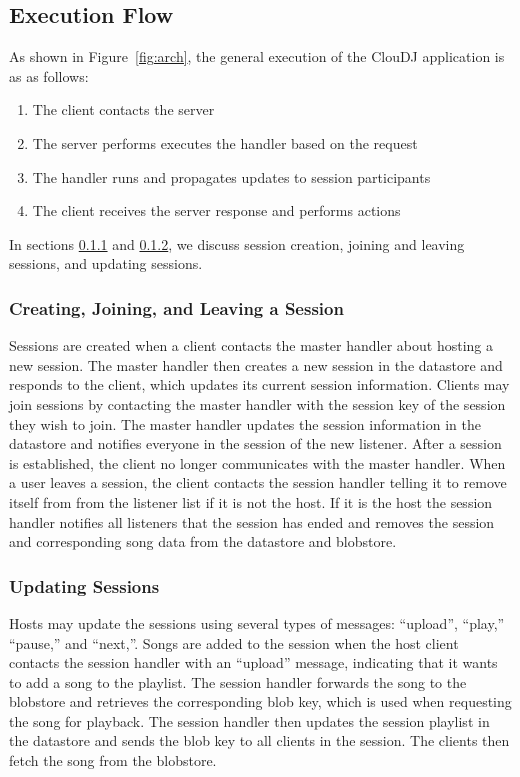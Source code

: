 \subsection{Execution Flow}
\label{sec:execution}
As shown in Figure~\ref{fig:arch}, the general execution of the ClouDJ application
is as as follows:
\begin{enumerate}
  \item The client contacts the server
  \item The server performs executes the handler based on the request
  \item The handler runs and propagates updates to session participants
  \item The client receives the server response and performs actions 
\end{enumerate}

In sections \ref{sec:joinSession} and \ref{sec:playSession}, we discuss
session creation, joining and leaving sessions, and updating sessions.


\subsubsection{Creating, Joining, and Leaving a Session}
\label{sec:joinSession}
Sessions are created when a client contacts the master 
handler about hosting a new session. The master handler 
then creates a new session in the datastore and responds to the client, 
which updates its current session information. 
Clients may join sessions by contacting the master 
handler with the session key of the session they wish to join. 
The master handler updates the session information in the datastore
and notifies everyone in the session of the new listener. 
After a session is established, the client no longer communicates 
with the master handler. When a user leaves a session, the client
contacts the session handler telling it to remove itself from from
the listener list if it is not the host. If it is the host the
session handler notifies all listeners that the session has ended and 
removes the session and corresponding song data from the datastore
and blobstore.

\subsubsection{Updating Sessions}
\label{sec:playSession}
Hosts may update the sessions using several types of messages: ``upload'',
``play,'' ``pause,'' and ``next,''. Songs are added to the session when 
the host client contacts the session handler with an ``upload'' message, 
indicating that it wants to add a song to the playlist. The session 
handler forwards the song to the blobstore and retrieves the corresponding 
blob key, which is used when requesting the song for playback. The session
handler then updates the session playlist in the datastore and sends the 
blob key to all clients in the session. The clients then fetch the song 
from the blobstore. 

